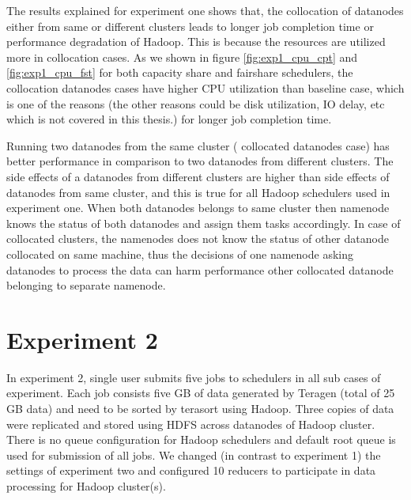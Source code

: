 The results explained for experiment one shows that, the collocation of datanodes either from same or different clusters leads to longer job completion time or performance degradation of Hadoop. This is because the resources are utilized more in collocation cases. As we shown in figure \ref{fig:exp1_cpu_cpt} and \ref{fig:exp1_cpu_fst}  for both capacity share and fairshare schedulers, the collocation datanodes cases have higher CPU utilization than baseline case, which is one of the reasons (the other reasons could be disk utilization, IO delay, etc which is not covered in this thesis.)  for longer job completion time. 


Running two datanodes from the same cluster ( collocated datanodes case)‌ has better performance in comparison to two datanodes from different clusters. The side effects of a datanodes from different clusters are higher than side effects of datanodes from same cluster, and this is true for all Hadoop schedulers used in experiment one. When both datanodes belongs to same cluster then namenode knows the status of both datanodes and assign them tasks accordingly. In case of collocated clusters, the namenodes does not know the status of other datanode collocated on same machine, thus the decisions of one namenode asking datanodes to process the data can harm performance other collocated datanode belonging to separate namenode.   \\  
  




 


\section{Experiment 2}

In experiment 2, single user submits five jobs to schedulers in all sub cases of experiment. Each job consists five GB‌ of data generated by Teragen (total of 25 GB data) and need to be sorted by terasort using Hadoop. Three copies of data were replicated and stored using HDFS‌ across datanodes of Hadoop cluster. There is no queue configuration for Hadoop schedulers and default root queue is  used for submission of all jobs. We changed (in contrast to experiment 1) the settings of experiment two and configured 10 reducers to participate in data processing for Hadoop cluster(s). ‌ 




